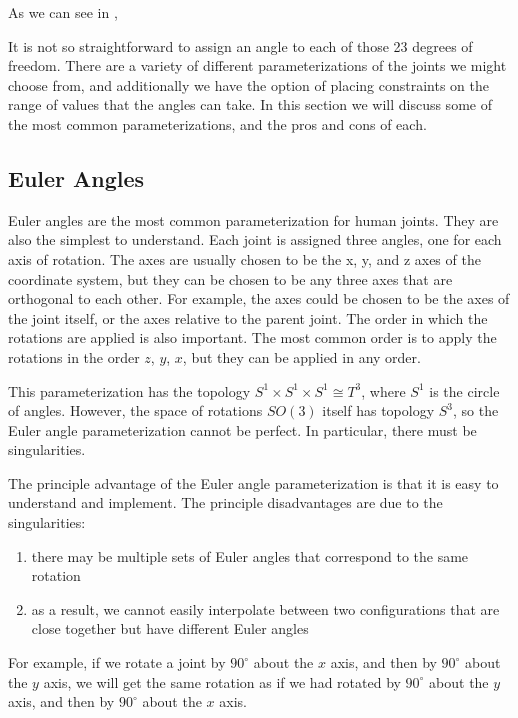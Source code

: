 As we can see in ,

It is not so straightforward to assign an angle to each of those 23 degrees of freedom. There are a variety of different parameterizations of the joints we might choose from, and additionally we have the option of placing constraints on the range of values that the angles can take. In this section we will discuss some of the most common parameterizations, and the pros and cons of each.

\subsection{Euler Angles}

Euler angles are the most common parameterization for human joints. They are also the simplest to understand. Each joint is assigned three angles, one for each axis of rotation. The axes are usually chosen to be the x, y, and z axes of the coordinate system, but they can be chosen to be any three axes that are orthogonal to each other.  For example, the axes could be chosen to be the axes of the joint itself, or the axes relative to the parent joint. The order in which the rotations are applied is also important. The most common order is to apply the rotations in the order $z$, $y$, $x$, but they can be applied in any order.

This parameterization has the topology $S^1 \times S^1 \times S^1 ≅ T^3$, where $S^1$ is the circle of angles. However, the space of rotations $SO(3)$ itself has topology $S^3$, so the Euler angle parameterization cannot be perfect. In particular, there must be singularities.

The principle advantage of the Euler angle parameterization is that it is easy to understand and implement. The principle disadvantages are due to the singularities:
\begin{enumerate}
    \item there may be multiple sets of Euler angles that correspond to the same rotation
    \item as a result, we cannot easily interpolate between two configurations that are close together but have different Euler angles
\end{enumerate}

For example, if we rotate a joint by $90^\circ$ about the $x$ axis, and then by $90^\circ$ about the $y$ axis, we will get the same rotation as if we had rotated by $90^\circ$ about the $y$ axis, and then by $90^\circ$ about the $x$ axis. 

